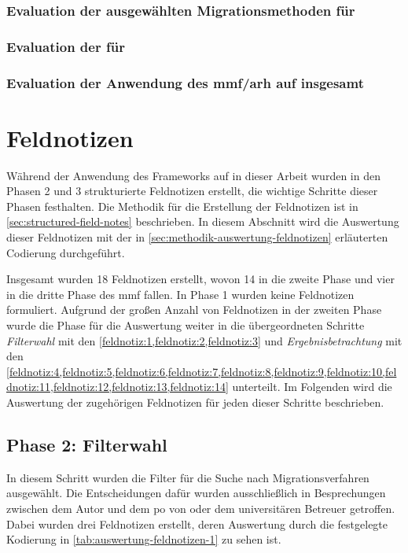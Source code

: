 \subsubsection{Evaluation der ausgewählten Migrationsmethoden für \jf}
\label{sec:evaluation-mmf-anwendung-methoden}
\subsubsection{Evaluation der \bpp für \jf}
\label{sec:evaluation-mmf-anwendung-bp-patterns}
\subsubsection{Evaluation der Anwendung des \gls{mmf}/\gls{arh} auf \jf insgesamt}
\label{sec:evaluation-mmf-anwendung-insgesamt}

\section{Feldnotizen}
\label{sec:auswertung-feldnotizen}

Während der Anwendung des Frameworks auf \jf in dieser Arbeit wurden in den Phasen 2 und 3 strukturierte Feldnotizen erstellt, die wichtige Schritte dieser Phasen festhalten.
Die Methodik für die Erstellung der Feldnotizen ist in \cref{sec:structured-field-notes} beschrieben.
In diesem Abschnitt wird die Auswertung dieser Feldnotizen mit der in \cref{sec:methodik-auswertung-feldnotizen} erläuterten Codierung  durchgeführt.

Insgesamt wurden 18 Feldnotizen erstellt, wovon 14 in die zweite Phase und vier in die dritte Phase des \gls{mmf} fallen.
In Phase 1 wurden keine Feldnotizen formuliert.
Aufgrund der großen Anzahl von Feldnotizen in der zweiten Phase wurde die Phase für die Auswertung weiter in die übergeordneten Schritte \emph{Filterwahl} mit den \cref{feldnotiz:1,feldnotiz:2,feldnotiz:3} und \emph{Ergebnisbetrachtung} mit den \cref{feldnotiz:4,feldnotiz:5,feldnotiz:6,feldnotiz:7,feldnotiz:8,feldnotiz:9,feldnotiz:10,feldnotiz:11,feldnotiz:12,feldnotiz:13,feldnotiz:14} unterteilt.
Im Folgenden wird die Auswertung der zugehörigen Feldnotizen für jeden dieser Schritte beschrieben.

\subsection{Phase 2: Filterwahl}

In diesem Schritt wurden die Filter für die Suche nach Migrationsverfahren ausgewählt.
Die Entscheidungen dafür wurden ausschließlich in Besprechungen zwischen dem Autor und dem \gls{po} von \jf oder dem universitären Betreuer getroffen.
Dabei wurden drei Feldnotizen erstellt, deren Auswertung durch die festgelegte Kodierung in \cref{tab:auswertung-feldnotizen-1} zu sehen ist.


